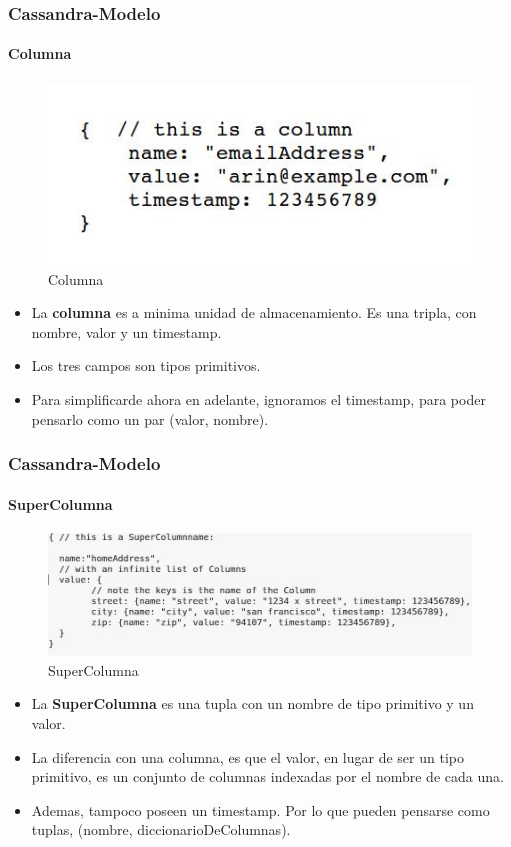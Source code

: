 \documentclass{beamer}
\begin{document}
\begin{frame}
  \frametitle{Cassandra-Modelo}
  \framesubtitle{Columna}
   \begin{figure}[h!]
      \centering        
      \includegraphics[scale=0.4]{column.jpg}
      \caption{Columna}
  \end{figure}

  \begin{itemize}
    \setlength{\itemsep}{4pt}
    \item La \textbf{columna} es a minima unidad de almacenamiento. Es una tripla, con nombre, valor y un timestamp.
    \pause
    \item  Los tres campos son tipos primitivos. 
    \pause
    \item  Para simplificarde ahora en adelante, ignoramos el timestamp, para poder pensarlo como un par (valor, nombre).
    
    

  \end{itemize}
\end{frame}


\begin{frame}
  \frametitle{Cassandra-Modelo}
  \framesubtitle{SuperColumna}
   \begin{figure}[h!]
      \centering        
      \includegraphics[scale=0.25]{supercolumn.jpg}
      \caption{SuperColumna}
  \end{figure}

  \begin{itemize}
    \setlength{\itemsep}{2pt}
    \item La \textbf{SuperColumna} es una tupla con un nombre de tipo primitivo y un valor.
    \pause
    \item La diferencia con una columna, es que el valor, en lugar de ser un tipo primitivo, es un conjunto de columnas indexadas por el nombre de cada una.
    \pause
    \item Ademas, tampoco poseen un timestamp. Por lo que pueden pensarse como tuplas, (nombre, diccionarioDeColumnas).
  \end{itemize}
\end{frame}
\end{document}
